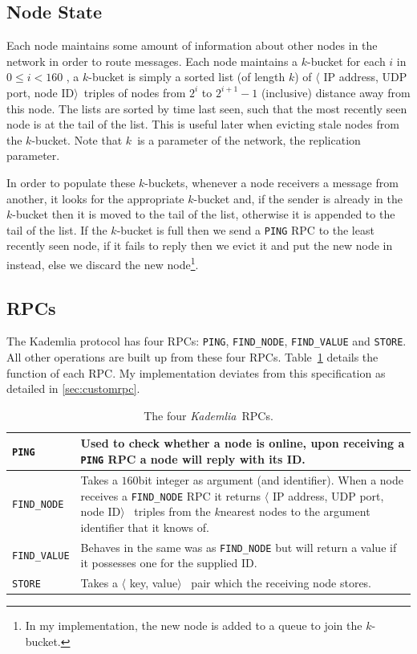 \documentclass[12pt,notitlepage,a4paper]{report}
\newcommand{\kademlia}{\emph{Kademlia}}
\newcommand{\K}{$k$}
\begin{document}
	\subsection{Node State}
	Each node maintains some amount of information about other nodes in the network in order to route messages. Each node maintains a \K-bucket for each $i$ in $0 \leq i < 160$ , a \K-bucket is simply a sorted list (of length \K) of $\langle$ IP address, UDP port, node ID$\rangle$~triples of nodes from $2^i$ to $2^{i+1}-1$ (inclusive) distance away from this node. The lists are sorted by time last seen, such that the most recently seen node is at the tail of the list. This is useful later when evicting stale nodes from the \K-bucket. Note that \K~is a parameter of the network, the replication parameter.
	
	In order to populate these \K-buckets, whenever a node receivers a message from another, it looks for the appropriate \K-bucket and, if the sender is already in the \K-bucket then it is moved to the tail of the list, otherwise it is appended to the tail of the list. If the \K-bucket is full then we send a \texttt{PING} RPC to the least recently seen node, if it fails to reply then we evict it and put the new node in instead, else we discard the new node\footnote{In my implementation, the new node is added to a queue to join the \K-bucket.}.
	
	\subsection{RPCs}
	The Kademlia protocol has four RPCs: \texttt{PING}, \texttt{FIND\_NODE}, \texttt{FIND\_VALUE} and \texttt{STORE}. All other operations are built up from these four RPCs. Table~\ref{tab:rpcs} details the function of each RPC. My implementation deviates from this specification as detailed in \cref{sec:customrpc}.
	
	\begin{table}[!ht]
		\begin{tabularx}{\textwidth}{| l | X |}
			\hline
			\texttt{PING} & Used to check whether a node is online, upon receiving a \texttt{PING} RPC a node will reply with its ID.\\
			\hline
			\texttt{FIND\_NODE} & Takes a $160$bit integer as argument (and identifier). When a node receives a \texttt{FIND\_NODE} RPC it returns $\langle$ IP address, UDP port, node ID$\rangle$~ triples from the \K nearest nodes to the argument identifier that it knows of.\\
			\hline
			\texttt{FIND\_VALUE} & Behaves in the same was as \texttt{FIND\_NODE} but will return a value if it possesses one for the supplied ID.\\
			\hline
			\texttt{STORE} & Takes a $\langle$ key, value$\rangle$~ pair which the receiving node stores.\\
			\hline
		\end{tabularx}
		\caption{The four \kademlia~RPCs.}
		\label{tab:rpcs}
	\end{table}
	
\end{document}
